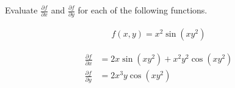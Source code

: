 Evaluate $\frac{\partial f}{\partial x}$ and $\frac{\partial f}{\partial y}$ for each of the following functions.

\begin{align*}
    f(x, y) = x^2\sin(xy^2)
\end{align*}

\begin{solution}
\begin{align*}
    \frac{\partial f}{\partial x} &= 2x\sin(xy^2) + x^2y^2 \cos(xy^2) \\
    \frac{\partial f}{\partial y} &= 2x^3y\cos(xy^2) \\
\end{align*}
\end{solution}